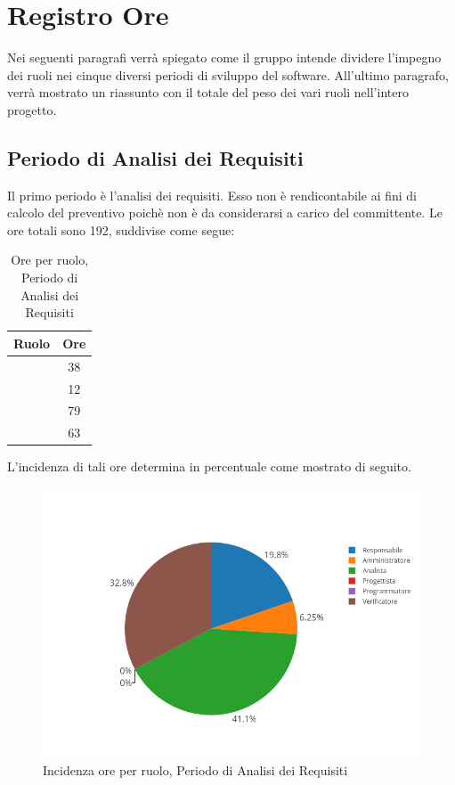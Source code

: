 \newpage

\section{Registro Ore}
Nei seguenti paragrafi verrà spiegato come il gruppo intende dividere l'impegno dei ruoli nei cinque diversi periodi di sviluppo del software. All'ultimo paragrafo, verrà mostrato un riassunto con il totale del peso dei vari ruoli nell'intero progetto.

\subsection{Periodo di Analisi dei Requisiti}
Il primo periodo è l'analisi dei requisiti. Esso non è rendicontabile ai fini di calcolo del preventivo poichè non è da considerarsi a carico del committente. Le ore totali sono 192, suddivise come segue:

\begin{table}[H]
	\begin{center}
		\begin{tabular}{|c|c|}
			\hline
			\textbf{Ruolo}	& \textbf{Ore} \\
			\hline
			\Res	&	38	\\
			\hline
			\Amm	&	12	\\
			\hline
			\Ana	&	79	\\
			\hline
			\Ver	&	63	\\
			\hline
		\end{tabular}
	\end{center}
	\caption{Ore per ruolo, Periodo di Analisi dei Requisiti}
\end{table}

L'incidenza di tali ore determina in percentuale come mostrato di seguito.
\begin{figure}[H]
	\centering
	\includegraphics[scale=0.6]{img/AnalisiRequisiiti.png}
	\caption{Incidenza ore per ruolo, Periodo di Analisi dei Requisiti}
\end{figure}

